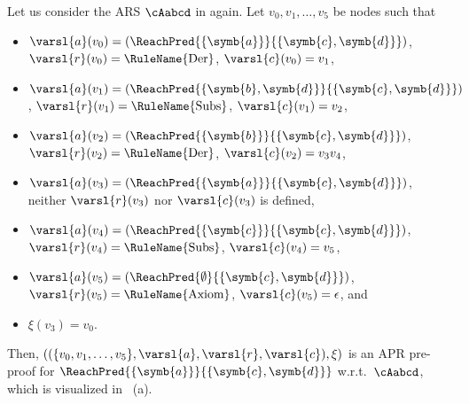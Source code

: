 \begin{example}
	\label{ex:APR-pre-proof-of-cAabcd}
	Let us consider the ARS $\cAabcd$ in  again.
	Let $v_0,v_1,\ldots,v_5$ be nodes such that
	\begin{itemize}
		\item $\varsl{a}(v_0) = (\ReachPred{\{\symb{a}\}}{\{\symb{c},\symb{d}\}})$, $\varsl{r}(v_0)=\mbox{\rm\RuleName{Der}}$, $\varsl{c}(v_0) = v_1$,
		\item $\varsl{a}(v_1) = (\ReachPred{\{\symb{b},\symb{d}\}}{\{\symb{c},\symb{d}\}})$, $\varsl{r}(v_1)=\mbox{\rm\RuleName{Subs}}$, $\varsl{c}(v_1) = v_2$,
		\item $\varsl{a}(v_2) = (\ReachPred{\{\symb{b}\}}{\{\symb{c},\symb{d}\}})$, $\varsl{r}(v_2)=\mbox{\rm\RuleName{Der}}$, $\varsl{c}(v_2) = v_3v_4$,
		\item $\varsl{a}(v_3) = (\ReachPred{\{\symb{a}\}}{\{\symb{c},\symb{d}\}})$, neither $\varsl{r}(v_3)$ nor $\varsl{c}(v_3)$ is defined,
		\item $\varsl{a}(v_4) = (\ReachPred{\{\symb{c}\}}{\{\symb{c},\symb{d}\}})$, $\varsl{r}(v_4)=\mbox{\rm\RuleName{Subs}}$, $\varsl{c}(v_4) = v_5$,
		\item $\varsl{a}(v_5) = (\ReachPred{\emptyset}{\{\symb{c},\symb{d}\}})$, $\varsl{r}(v_5)=\mbox{\rm\RuleName{Axiom}}$, $\varsl{c}(v_5) = \epsilon$,
		      and
		\item $\xi(v_3) = v_0$.
	\end{itemize}
	Then, $((\{v_0,v_1,\ldots,v_5\},\varsl{a},\varsl{r},\varsl{c}),\xi)$ is an APR pre-proof for $\ReachPred{\{\symb{a}\}}{\{\symb{c},\symb{d}\}}$ w.r.t.\ $\cAabcd$,
	which is visualized in ~(a).
\end{example}

